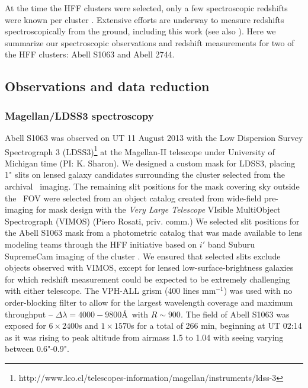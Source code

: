 At the time the HFF clusters were selected, only a few spectroscopic redshifts were known per cluster \citep{Zitrin:2013lr,Limousin:2012fj,Smith:2009lr,Richard:2010wd}. Extensive efforts are underway to measure redshifts spectroscopically from the ground, including this work (see also \citealt{Richard:2014gf,Monna:2014lr}). Here we summarize our spectroscopic observations and redshift measurements for two of the HFF clusters: Abell S1063 and Abell 2744.

\subsection{Observations and data reduction}

\subsubsection{Magellan/LDSS3 spectroscopy}
Abell S1063 was observed on UT 11 August 2013 with the Low Dispersion Survey Spectrograph 3 (LDSS3)\footnote{http://www.lco.cl/telescopes-information/magellan/instruments/ldss-3} at the Magellan-II telescope under University of Michigan time (PI: K. Sharon). We designed a custom mask for LDSS3, placing 1" slits on lensed galaxy candidates surrounding the cluster selected from the archival \hst\ imaging. The remaining slit positions for the mask covering sky outside the \hst\ FOV were selected from an object catalog created from wide-field pre-imaging for mask design with the \emph{Very Large Telescope} VIsible MultiObject Spectrograph (VIMOS) (Piero Rosati, priv. comm.) We selected slit positions for the Abell S1063 mask from a photometric catalog that was made available to lens modeling teams through the HFF initiative based on $i'$ band Suburu SupremeCam imaging of the cluster \citep{Merten:2011fk}. We ensured that selected slits exclude objects observed with VIMOS, except for lensed low-surface-brightness galaxies for which redshift measurement could be expected to be extremely challenging with either telescope. The VPH-ALL grism (400 lines $\mathrm{mm^{-1}}$) was used with no order-blocking filter to allow for the largest wavelength coverage and maximum throughput -- $\Delta\lambda=4000-9800$\AA\ with $R\sim900$. The field of Abell S1063 was exposed for $6\times2400$s and $1\times1570$s for a total of 266 min, beginning at UT 02:14 as it was rising to peak altitude from airmass 1.5 to 1.04 with seeing varying between 0.6"-0.9".

